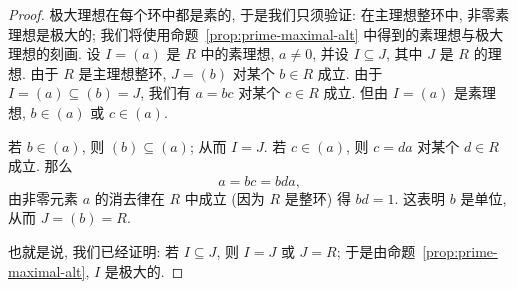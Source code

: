 \begin{proof}
极大理想在每个环中都是素的, 于是我们只须验证: 在主理想整环中, 非零素理想是极大的; 我们将使用命题~\ref{prop:prime-maximal-alt} 中得到的素理想与极大理想的刻画. 设 $I = (a)$ 是 $R$ 中的素理想, $a \neq 0$, 并设 $I \subseteq J$, 其中 $J$ 是 $R$ 的理想. 由于 $R$ 是主理想整环, $J = (b)$ 对某个 $b \in R$ 成立. 由于 $I = (a) \subseteq (b) = J$, 我们有 $a = bc$ 对某个 $c \in R$ 成立. 但由 $I = (a)$ 是素理想, $b \in (a)$ 或 $c \in (a)$.

若 $b \in (a)$, 则 $(b) \subseteq (a)$; 从而 $I = J$. 若 $c \in (a)$, 则 $c = da$ 对某个 $d \in R$ 成立. 那么
\[
a = bc = bda,
\]
由非零元素 $a$ 的消去律在 $R$ 中成立 (因为 $R$ 是整环) 得 $bd = 1$. 这表明 $b$ 是单位, 从而 $J = (b) = R$.

也就是说, 我们已经证明: 若 $I \subseteq J$, 则 $I = J$ 或 $J = R$; 于是由命题~\ref{prop:prime-maximal-alt}, $I$ 是极大的.
\end{proof}

